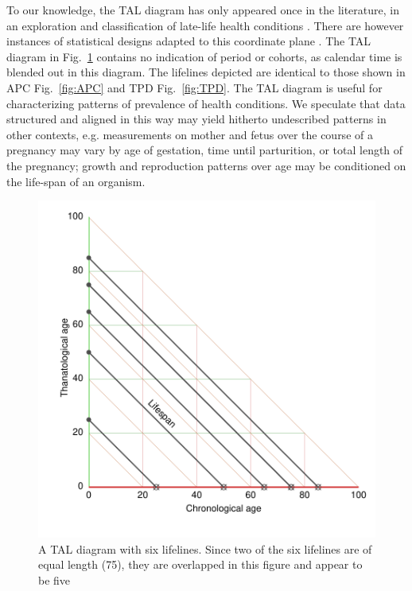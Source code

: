 \documentclass[12pt,oneside,a4paper,doublespacing]{article} %
\theoremstyle{definition}
\begin{document}
To our knowledge, the TAL diagram has only appeared once in the literature, in an exploration and classification of late-life health
conditions \citep{riffe2016ttd}. There are however instances of statistical
designs adapted to this coordinate plane \citep[see e.g.,][]{dempsey2016, Jewell2016}. The TAL diagram in Fig.~\ref{fig:TAL} contains no indication of
period or cohorts, as calendar time is blended out in this diagram.
The lifelines depicted are identical to those shown in APC Fig.~\ref{fig:APC}
and TPD Fig.~\ref{fig:TPD}. The TAL diagram is useful for characterizing patterns of prevalence of health conditions. We speculate
that data structured and aligned in this way may yield hitherto undescribed
patterns in other contexts, e.g. measurements on mother and fetus over the
course of a pregnancy may vary by age of gestation, time until parturition, or
total length of the pregnancy; growth and reproduction patterns over age may be conditioned on the life-span of an organism.

\begin{figure}[h!] 
\caption{A TAL diagram with six lifelines. Since two of the six lifelines are of equal length (75), they are
overlapped in this figure and appear to be five}
\label{fig:TAL}
\centering
\includegraphics[scale=0.7]{Figures/TALrt.pdf}
\end{figure} 
\end{document}
